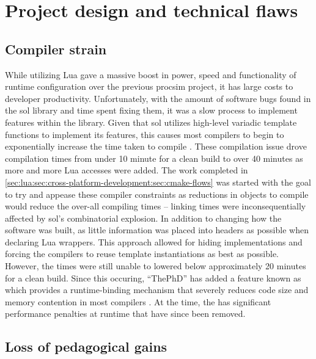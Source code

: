 \section{Project design and technical flaws}

\subsection{Compiler strain}

While utilizing Lua gave a massive boost in power, speed and functionality of runtime configuration over the previous procsim project, it has large costs to developer productivity. Unfortunately, with the amount of software bugs found in the sol library and time spent fixing them, it was a slow process to implement features within the library. Given that sol utilizes high-level variadic template functions to implement its features, this causes most compilers to begin to exponentially increase the time taken to compile \cite{Github:ThePhD:sol2:issue:126, Github:ThePhD:sol2:issue:295, Github:ThePhD:sol2:compilation}. These compilation issue drove compilation times from under 10 minute for a clean build to over 40 minutes as more and more Lua accesses were added. The work completed in \cref{sec:lua:sec:cross-platform-development:sec:cmake-flows} was started with the goal to try and appease these compiler constraints as reductions in objects to compile would reduce the over-all compiling times -- linking times were inconsequentially affected by sol's combinatorial explosion. In addition to changing how the software was built, as little information was placed into headers as possible when declaring Lua wrappers. This approach allowed for hiding implementations and forcing the compilers to reuse template instantiations as best as possible. However, the times were still unable to lowered below approximately 20 minutes for a clean build. Since this occuring, ``ThePhD'' has added a feature known as  which provides a runtime-binding mechanism that severely reduces code size and memory contention in most compilers \cite{Github:ThePhD:sol2:simple-usertype}. At the time, the  has significant performance penalties at runtime that have since been removed. 

\subsection{Loss of pedagogical gains}

